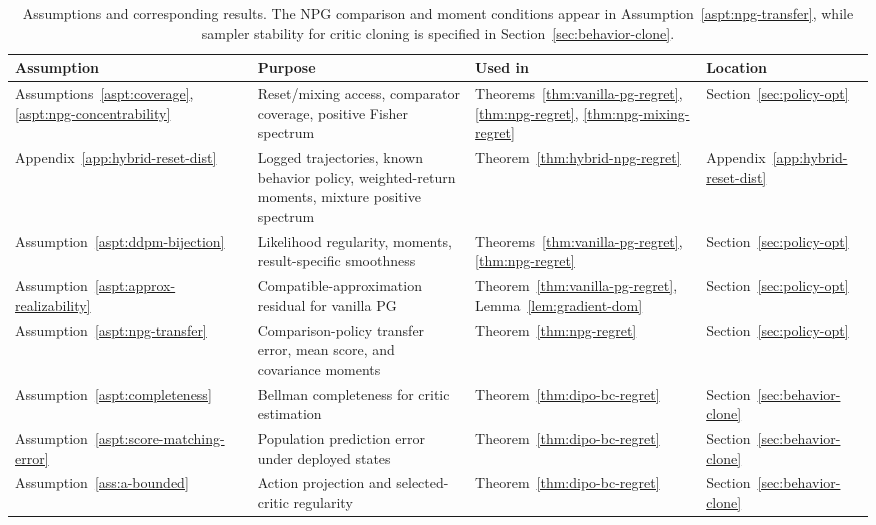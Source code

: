 \begin{table}[tbp]
    \centering
    \small
    \setlength{\tabcolsep}{4pt}
    \renewcommand{\arraystretch}{1.4}
    \begin{tabular}{|>{\raggedright\arraybackslash}p{.17\linewidth}|>{\raggedright\arraybackslash}p{.36\linewidth}|>{\raggedright\arraybackslash}p{.18\linewidth}|>{\raggedright\arraybackslash}p{.17\linewidth}|}
        \hline \textbf{Assumption} &  \textbf{Purpose} &  \textbf{Used in} &  \textbf{Location} \\
        \hline Assumptions~\ref{aspt:coverage}, \ref{aspt:npg-concentrability} & Reset/mixing access, comparator coverage, positive Fisher spectrum & Theorems~\ref{thm:vanilla-pg-regret}, \ref{thm:npg-regret}, \ref{thm:npg-mixing-regret} & Section~\ref{sec:policy-opt} \\
        \hline Appendix~\ref{app:hybrid-reset-dist} & Logged trajectories, known behavior policy, weighted-return moments, mixture positive spectrum & Theorem~\ref{thm:hybrid-npg-regret} & Appendix~\ref{app:hybrid-reset-dist} \\
        \hline Assumption~\ref{aspt:ddpm-bijection} & Likelihood regularity, moments, result-specific smoothness & Theorems~\ref{thm:vanilla-pg-regret}, \ref{thm:npg-regret} & Section~\ref{sec:policy-opt} \\
        \hline Assumption~\ref{aspt:approx-realizability} & Compatible-approximation residual for vanilla PG & Theorem~\ref{thm:vanilla-pg-regret}, Lemma~\ref{lem:gradient-dom} & Section~\ref{sec:policy-opt} \\
        \hline Assumption~\ref{aspt:npg-transfer} & Comparison-policy transfer error, mean score, and covariance moments & Theorem~\ref{thm:npg-regret} & Section~\ref{sec:policy-opt} \\
        \hline Assumption~\ref{aspt:completeness} & Bellman completeness for critic estimation & Theorem~\ref{thm:dipo-bc-regret} & Section~\ref{sec:behavior-clone} \\
        \hline Assumption~\ref{aspt:score-matching-error} & Population prediction error under deployed states & Theorem~\ref{thm:dipo-bc-regret} & Section~\ref{sec:behavior-clone} \\
        \hline Assumption~\ref{ass:a-bounded} & Action projection and selected-critic regularity & Theorem~\ref{thm:dipo-bc-regret} & Section~\ref{sec:behavior-clone} \\
        \hline
        \end{tabular}
    \vspace{3pt}
    \caption[Summary of assumptions and corresponding results for diffusion policies]{Assumptions and corresponding results. The NPG comparison and moment conditions appear in Assumption~\ref{aspt:npg-transfer}, while sampler stability for critic cloning is specified in Section~\ref{sec:behavior-clone}.}
    \label{tab:assp-to-result}
\end{table}

